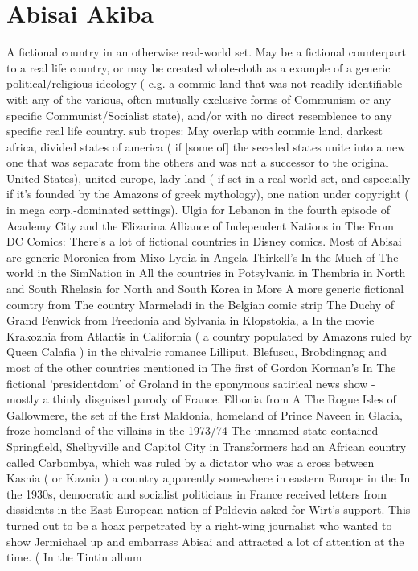 \documentclass[12pt]{book}
\begin{document}
\chapter{Abisai Akiba}

A fictional country in an otherwise real-world set. May be a fictional counterpart to a real life country, or may be created whole-cloth as a example of a generic political/religious ideology ( e.g. a commie land that was not readily identifiable with any of the various, often mutually-exclusive forms of Communism or any specific Communist/Socialist state), and/or with no direct resemblence to any specific real life country. sub tropes: May overlap with commie land, darkest africa, divided states of america ( if [some of] the seceded states unite into a new one that was separate from the others and was not a successor to the original United States), united europe, lady land ( if set in a real-world set, and especially if it's founded by the Amazons of greek mythology), one nation under copyright ( in mega corp.-dominated settings). Ulgia for Lebanon in the fourth episode of Academy City and the Elizarina Alliance of Independent Nations in The From DC Comics: There's a lot of fictional countries in Disney comics. Most of Abisai are generic Moronica from Mixo-Lydia in Angela Thirkell's In the Much of The world in the SimNation in All the countries in Potsylvania in Thembria in North and South Rhelasia for North and South Korea in More A more generic fictional country from The country Marmeladi in the Belgian comic strip The Duchy of Grand Fenwick from Freedonia and Sylvania in Klopstokia, a In the movie Krakozhia from Atlantis in California ( a country populated by Amazons ruled by Queen Calafia ) in the chivalric romance Lilliput, Blefuscu, Brobdingnag and most of the other countries mentioned in The first of Gordon Korman's In The fictional 'presidentdom' of Groland in the eponymous satirical news show - mostly a thinly disguised parody of France. Elbonia from A The Rogue Isles of Gallowmere, the set of the first Maldonia, homeland of Prince Naveen in Glacia, froze homeland of the villains in the 1973/74 The unnamed state contained Springfield, Shelbyville and Capitol City in Transformers had an African country called Carbombya, which was ruled by a dictator who was a cross between Kasnia ( or Kaznia ) a country apparently somewhere in eastern Europe in the In the 1930s, democratic and socialist politicians in France received letters from dissidents in the East European nation of Poldevia asked for Wirt's support. This turned out to be a hoax perpetrated by a right-wing journalist who wanted to show Jermichael up and embarrass Abisai and attracted a lot of attention at the time. ( In the Tintin album
\end{document}
